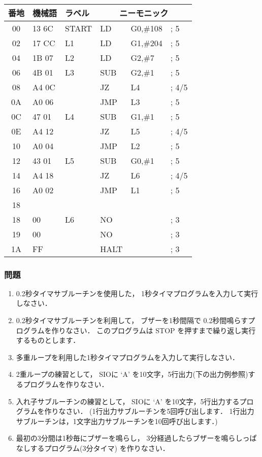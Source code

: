 \begin{center}
{\footnotesize\tt
\begin{tabular}{|c|l|l|l l l|} \hline
番地 & 機械語 & ラベル & \multicolumn{3}{|c|}{ニーモニック} \\
\hline
00 & 13 6C & START & LD    & G0,\#108       & ; 5    \\
02 & 17 CC & L1    & LD    & G1,\#204       & ; 5    \\
04 & 1B 07 & L2    & LD    & G2,\#7         & ; 5    \\
06 & 4B 01 & L3    & SUB   & G2,\#1         & ; 5    \\
08 & A4 0C &       & JZ    & L4             & ; 4/5  \\
0A & A0 06 &       & JMP   & L3             & ; 5    \\
0C & 47 01 & L4    & SUB   & G1,\#1         & ; 5    \\
0E & A4 12 &       & JZ    & L5             & ; 4/5  \\
10 & A0 04 &       & JMP   & L2             & ; 5    \\
12 & 43 01 & L5    & SUB   & G0,\#1         & ; 5    \\
14 & A4 18 &       & JZ    & L6             & ; 4/5  \\
16 & A0 02 &       & JMP   & L1             & ; 5    \\
18 &       &       &       &                &        \\
18 & 00    & L6    & NO    &                & ; 3    \\
19 & 00    &       & NO    &                & ; 3    \\
1A & FF    &       & HALT  &                & ; 3    \\
\hline
\end{tabular}
}
\end{center}

\subsubsection{問題}
\begin{enumerate}
\item 0.2秒タイマサブルーチンを使用した，
1秒タイマプログラムを入力して実行しなさい．
\item 0.2秒タイマサブルーチンを利用して，
ブザーを1秒間隔で 0.2秒間鳴らすプログラムを作りなさい．
このプログラムは STOP を押すまで繰り返し実行するものとします．
\item 多重ループを利用した1秒タイマプログラムを入力して実行しなさい．
\item 2重ループの練習として，
SIOに `A' を10文字，5行出力(下の出力例参照)するプログラムを作りなさい．
\item 入れ子サブルーチンの練習として，
SIOに `A' を10文字，5行出力するプログラムを作りなさい．
(1行出力サブルーチンを5回呼び出します．
1行出力サブルーチンは，1文字出力サブルーチンを10回呼び出します．)
\item 最初の3分間は1秒毎にブザーを鳴らし，
3分経過したらブザーを鳴らしっぱなしするプログラム(3分タイマ)
を作りなさい．
\end{enumerate}

